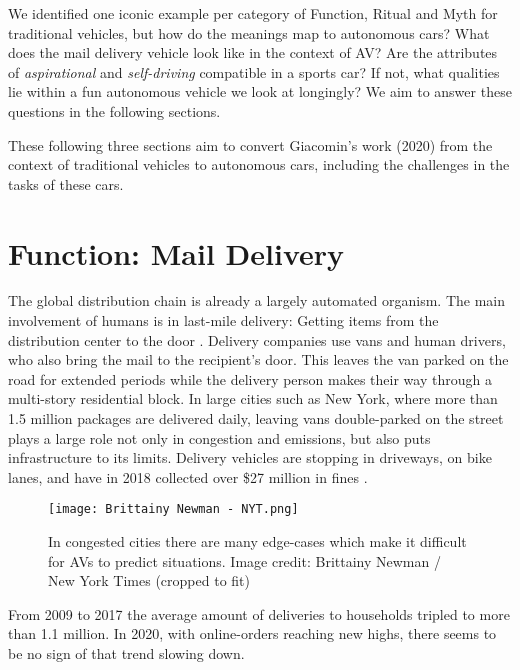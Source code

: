 \documentclass[12pt, usenames, dvipsnames]{report}
\begin{document}
\begin{flushleft}
We identified one iconic example per category of Function, Ritual and Myth for traditional vehicles, but how do the meanings map to autonomous cars?
What does the mail delivery vehicle look like in the context of AV? 
Are the attributes of \emph{aspirational} and \emph{self-driving} compatible in a sports car?
If not, what qualities lie within a fun autonomous vehicle we look at longingly?
We aim to answer these questions in the following sections.

These following three sections aim to convert Giacomin's work (2020) \cite{giacomin2020} from the context of traditional vehicles to autonomous cars, including the challenges in the tasks of these cars.


\section{Function: Mail Delivery}

The global distribution chain is already a largely automated organism. 
The main involvement of humans is in last-mile delivery:
Getting items from the distribution center to the door \cite{mckinsey2016}.
Delivery companies use vans and human drivers, who also bring the mail to the recipient's door.
This leaves the van parked on the road for extended periods while the delivery person makes their way through a multi-story residential block.
In large cities such as New York, where more than 1.5 million packages are delivered daily, leaving vans double-parked on the street plays a large role not only in congestion and emissions, but also puts infrastructure to its limits.
Delivery vehicles are stopping in driveways, on bike lanes, and have in 2018 collected over \$27 million in fines \cite{haag2019}.

\vspace*{0.8em}
\begin{figure}[!htbp]
  \hspace*{5em}
  \texttt{[image: Brittainy Newman - NYT.png]}
  \caption{In congested cities there are many edge-cases which make it difficult for AVs to predict situations. Image credit: Brittainy Newman / New York Times (cropped to fit)}
  \label{fig:newmannyt}
\end{figure}
\vspace*{0.6em}

From 2009 to 2017 the average amount of deliveries to households tripled to more than 1.1 million.
In 2020, with online-orders reaching new highs, there seems to be no sign of that trend slowing down.


\end{flushleft}
\end{document}
